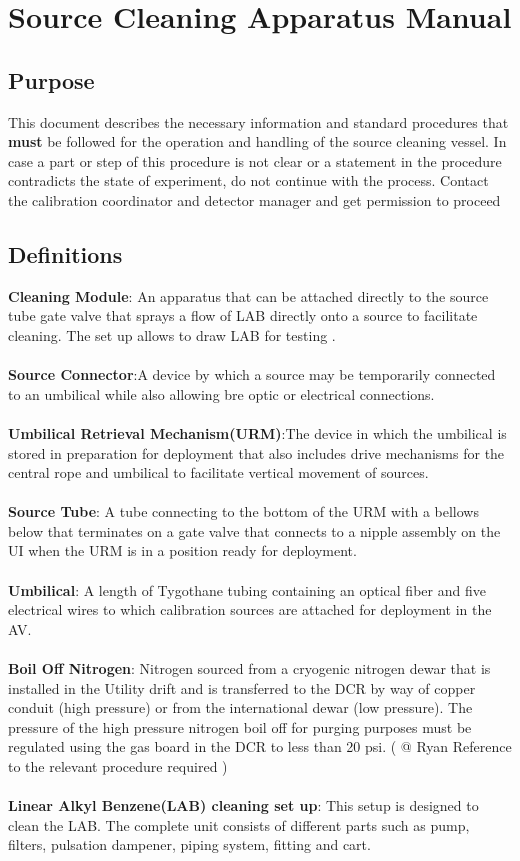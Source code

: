 \chapter{Source Cleaning Apparatus Manual}
\section{Purpose}
This document describes the necessary information and standard procedures that \textbf{must} be followed for the operation and handling of  the source cleaning vessel. In case a part or step of this procedure is not clear or a statement in the procedure contradicts the state of experiment, do not continue with the process. Contact the calibration coordinator and detector manager and get permission to proceed 
\section{Definitions}
\textbf{Cleaning Module}: An apparatus that can be attached directly to the source tube gate valve that sprays a flow of LAB directly onto a source to facilitate cleaning. The set up allows to draw LAB for testing .\\
\\
\textbf{Source Connector}:A device by which a source may be temporarily connected to an umbilical while also allowing bre optic or electrical connections.\\
\\
\textbf{Umbilical Retrieval Mechanism(URM)}:The device in which the umbilical is stored
in preparation for deployment that also includes drive mechanisms for the central rope and umbilical to facilitate vertical movement of sources.\\
\\
\textbf{Source Tube}: A tube connecting to the bottom of the URM with a bellows below that terminates on a gate valve that connects to a nipple assembly on the UI when the URM is in a position ready for deployment.\\
\\
\textbf{Umbilical}: A length of Tygothane tubing containing an optical fiber and five electrical wires to which calibration sources are attached for deployment in the AV.\\
\\
\textbf{Boil Off Nitrogen}: Nitrogen sourced from a cryogenic nitrogen dewar that is installed in the Utility drift and is transferred  to the DCR by way of copper conduit (high pressure) or from the international dewar (low pressure). The pressure of the high pressure nitrogen boil off  for purging purposes must be regulated using the gas board in the DCR to less than 20 psi. ( @ Ryan Reference to the relevant procedure required )\\
\\
\textbf{Linear Alkyl Benzene(LAB) cleaning set up}: This setup is designed to clean the LAB. The complete unit consists of different parts such as pump, filters, pulsation dampener, piping system, fitting and cart.\\
